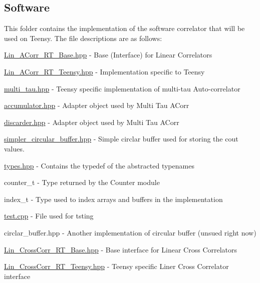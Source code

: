 \subsection*{Software}

This folder contains the implementation of the software correlator that will be used on Teensy. The file descriptions are as follows\+:


\begin{DoxyItemize}
\item {\ttfamily \hyperlink{Lin__ACorr__RT__Base_8hpp}{Lin\+\_\+\+A\+Corr\+\_\+\+R\+T\+\_\+\+Base.\+hpp}} -\/ Base (Interface) for Linear Correlators
\item {\ttfamily \hyperlink{Lin__ACorr__RT__Teensy_8hpp}{Lin\+\_\+\+A\+Corr\+\_\+\+R\+T\+\_\+\+Teensy.\+hpp}} -\/ Implementation specific to Teensy
\item {\ttfamily \hyperlink{multi__tau_8hpp}{multi\+\_\+tau.\+hpp}} -\/ Teensy specific implementation of multi-\/tau Auto-\/correlator
\item {\ttfamily \hyperlink{accumulator_8hpp}{accumulator.\+hpp}} -\/ Adapter object used by Multi Tau A\+Corr
\item {\ttfamily \hyperlink{discarder_8hpp}{discarder.\+hpp}} -\/ Adapter object used by Multi Tau A\+Corr
\item {\ttfamily \hyperlink{simpler__circular__buffer_8hpp}{simpler\+\_\+circular\+\_\+buffer.\+hpp}} -\/ Simple circlar buffer used for storing the cout values.
\item {\ttfamily \hyperlink{types_8hpp}{types.\+hpp}} -\/ Contains the {\ttfamily typedef} of the abstracted typenames
\begin{DoxyItemize}
\item {\ttfamily counter\+\_\+t} -\/ Type returned by the Counter module
\item {\ttfamily index\+\_\+t} -\/ Type used to index arrays and buffers in the implementation
\end{DoxyItemize}
\item {\ttfamily \hyperlink{test_8cpp}{test.\+cpp}} -\/ File used for tsting
\item {\ttfamily circlar\+\_\+buffer.\+hpp} -\/ Another implementation of circular buffer (unsued right now)
\item {\ttfamily \hyperlink{Lin__CrossCorr__RT__Base_8hpp}{Lin\+\_\+\+Cross\+Corr\+\_\+\+R\+T\+\_\+\+Base.\+hpp}} -\/ Base interface for Linear Cross Correlators
\item {\ttfamily \hyperlink{Lin__CrossCorr__RT__Teensy_8hpp}{Lin\+\_\+\+Cross\+Corr\+\_\+\+R\+T\+\_\+\+Teensy.\+hpp}} -\/ Teensy specific Liner Cross Correlator interface
\end{DoxyItemize}

